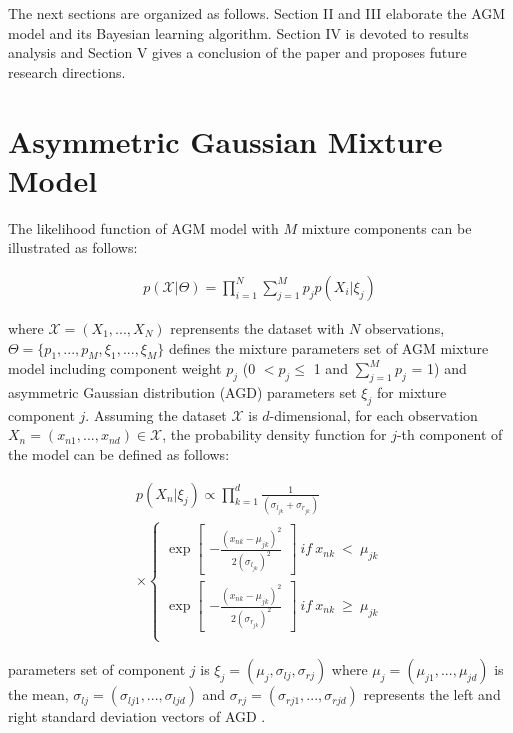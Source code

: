 \documentclass[conference]{IEEEtran}
\begin{document}
The next sections are organized as follows. Section II and III elaborate the AGM model and its Bayesian learning algorithm. Section IV is devoted to results analysis and Section V gives a conclusion of the paper and proposes future research directions. 


\section{Asymmetric Gaussian Mixture Model}
The likelihood function of AGM model\cite{Elguebaly2014} with $M$ mixture components can be illustrated as follows:

\begin{align}
p(\mathcal{X}|\Theta) = \prod_{i=1}^N \sum_{j=1}^Mp_jp(X_i|\xi_j)
\label{eq:likelihood}
\end{align}

where $\mathcal{X} = (X_1,...,X_N)$ reprensents the dataset with $N$ observations, $\Theta = \{p_1,...,p_M, \xi_1,...,\xi_M\}$ defines the mixture parameters set of AGM mixture model including component weight $p_j$ (0 $< p_j \leq$ 1 and $\sum_{j=1}^Mp_j$ = 1) and asymmetric Gaussian distribution (AGD) parameters set $\xi_j$ for mixture component $j$. Assuming the dataset $\mathcal{X}$ is $d$-dimensional, for each observation $X_n = (x_{n1},...,x_{nd})\in\mathcal{X}$, the probability density function\cite{Elguebaly2014} for $j$-th component of the model can be defined as follows:

\begin{multline}
p(X_n|\xi_j) \propto \prod_{k=1}^{d} \frac{1}{(\sigma_{l_{jk}}+\sigma_{r_{jk}})} \\
\times \left\{\begin{matrix}
\exp \begin{bmatrix}
-\frac{(x_{nk}-\mu_{jk})^2}{2(\sigma_{l_{jk}})^2}
\end{bmatrix}\ if\ x_{nk}\ <\ \mu_{jk} \\ 
\exp \begin{bmatrix}
-\frac{(x_{nk}-\mu_{jk})^2}{2(\sigma_{r_{jk}})^2}
\end{bmatrix}\ if\ x_{nk}\ \geqslant\ \mu_{jk} \\ 
\end{matrix}\right.
\label{eq:pdf}
\end{multline}

parameters set of component $j$ is $\xi_j = (\mu_j,\sigma_{lj},\sigma_{rj})$ where $\mu_j = (\mu_{j1},...,\mu_{jd})$ is the mean, $\sigma_{lj} = (\sigma_{lj1},...,\sigma_{ljd})$ and $\sigma_{rj} = (\sigma_{rj1},...,\sigma_{rjd})$ represents the left and right standard deviation vectors of AGD . 
\end{document}
